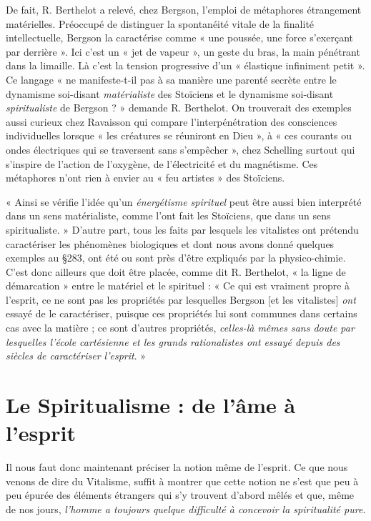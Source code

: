 \vspace{0.24cm}
{\footnotesize De fait, R. Berthelot a relevé, chez Bergson, l'emploi de métaphores
étrangement matérielles. Préoccupé de distinguer la spontanéité vitale de
la finalité intellectuelle, Bergson la caractérise comme « une poussée, une
force s’exerçant par derrière ». Ici c'est un « jet de vapeur », un geste du
bras, la main pénétrant dans la limaille. Là c’est la tension progressive d’un
« élastique infiniment petit ». Ce langage « ne manifeste-t-il pas à sa manière
une parenté secrète entre le dynamisme soi-disant {\it matérialiste} des Stoïciens
et le dynamisme soi-disant {\it spiritualiste} de Bergson ? » demande R. Berthelot.
On trouverait des exemples aussi curieux chez Ravaisson qui compare
l’interpénétration des consciences individuelles lorsque « les créatures se
réuniront en Dieu », à « ces courants ou ondes électriques qui se traversent
sans s'empêcher », chez Schelling surtout qui s'inspire de l’action de
l'oxygène, de l'électricité et du magnétisme. Ces métaphores n'ont rien
à envier au « feu artistes » des Stoïciens.}
\vspace{0.31cm}

« Ainsi se vérifie l’idée qu’un {\it énergétisme spirituel} peut être aussi
bien interprété dans un sens matérialiste, comme l'ont fait les Stoïciens,
que dans un sens spiritualiste. » D'autre part, tous les faits par
lesquels les vitalistes ont prétendu caractériser les phénomènes
biologiques et dont nous avons donné quelques exemples au \S 283,
ont été ou sont près d’être expliqués par la physico-chimie. C’est donc
ailleurs que doit être placée, comme dit R. Berthelot, « la ligne de
démarcation » entre le matériel et le spirituel : « Ce qui est vraiment
propre à l’esprit, ce ne sont pas les propriétés par lesquelles Bergson
[et les vitalistes] {\it ont} essayé de le caractériser, puisque ces propriétés
lui sont communes dans certains cas avec la matière ; ce sont d’autres
propriétés, {\it celles-là mêmes sans doute par lesquelles l'école cartésienne
et les grands rationalistes ont essayé depuis des siècles de caractériser
l'esprit}. »

\section{Le Spiritualisme : de l’âme à l'esprit}%
Il nous faut
donc maintenant préciser la notion même de l'esprit. Ce que nous
venons de dire du Vitalisme, suffit à montrer que cette notion ne
s’est que peu à peu épurée des éléments étrangers qui s’y trouvent
d’abord mêlés et que, même de nos jours, {\it l’homme a toujours quelque
difficulté à concevoir la spiritualité pure}.


